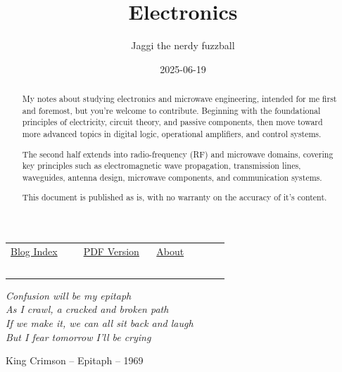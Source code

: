 \documentclass[11pt]{article}
\title{Electronics}
\author{Jaggi the nerdy fuzzball}
\date{2025-06-19}
\begin{document}
\maketitle
\ifdefined\HCode
\begin{center}
  \vspace{2em}
  \renewcommand{\arraystretch}{1.5}
  \begin{tabular}{
      >{\raggedright\arraybackslash}p{0.3\linewidth}
      >{\raggedright\arraybackslash}p{0.3\linewidth}
      >{\raggedright\arraybackslash}p{0.3\linewidth}
    }
    \href{../../index.html}{Blog Index} &
    \href{electronics.pdf}{PDF
    Version}                            &
    \href{../../about.html}{About}              \\
    ~                                   & ~ & ~ \\
  \end{tabular}
\end{center}
\fi
\begin{flushright}
  \textit
  {Confusion will be my epitaph\\
    As I crawl, a cracked and broken path\\
    If we make it, we can all sit back and laugh\\
  But I fear tomorrow I'll be crying}\par
  King Crimson -- Epitaph -- 1969
\end{flushright}

\tableofcontents

\newpage
\begin{abstract}
  My notes about studying electronics and microwave engineering,
  intended for me first and foremost, but you're welcome to contribute.
  Beginning with the foundational principles of electricity, circuit
  theory, and passive components, then move toward more advanced
  topics in digital logic, operational amplifiers, and control systems.

  The second half extends into radio-frequency (RF) and microwave
  domains, covering key principles such as electromagnetic wave
  propagation, transmission lines, waveguides, antenna design,
  microwave components, and communication systems.

  This document is published as is, with no warranty on the accuracy
  of it's content.
\end{abstract}
\end{document}
